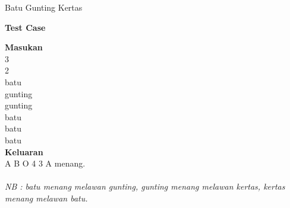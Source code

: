 \begin{permasalahan}{Batu Gunting Kertas}
	\begin{center}
	\textbf{Test Case}\\
	\end{center}
	\textbf{Masukan}\\
		3\\
		2\\
		batu\\
		gunting\\
		gunting\\
		batu\\
		batu\\
		batu\\
	\textbf{Keluaran}\\
	  A B O 4 3 A menang.\\\\		
		
		\textit{NB : batu menang melawan gunting, gunting menang melawan kertas, kertas menang melawan batu.}
\end{permasalahan}


